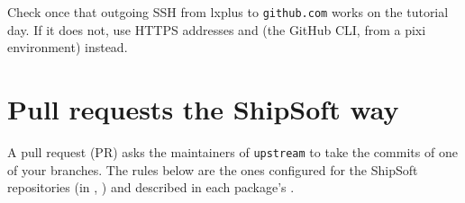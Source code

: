 \begin{organisernote}
Check once that outgoing SSH from lxplus to \texttt{github.com} works on the
tutorial day. If it does not, use HTTPS addresses and 
(the GitHub CLI, from a pixi environment) instead.
\end{organisernote}

\section{Pull requests the ShipSoft way}
\label{sec:pullrequests}

A pull request (PR) asks the maintainers of \texttt{upstream} to take the
commits of one of your branches. The rules below are the ones configured for
the ShipSoft repositories (in , ) and
described in each package's .

